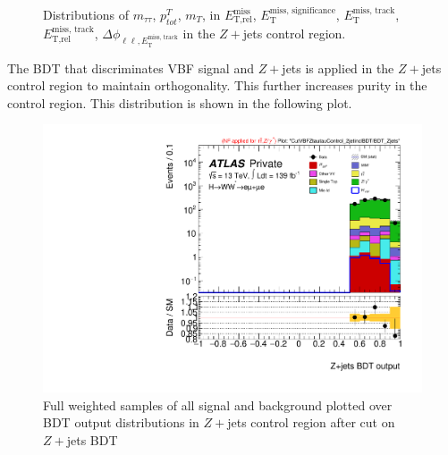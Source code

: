 \begin{figure}[!h]
{  }\hfill
  \hfill
  \hfill
{\caption{Distributions of $m_{\tau\tau}$, $p^T_{tot}$, $m_T$, in $\ensuremath{E_{\text{T,rel}}^{\text{miss}}}$, $\ensuremath{E_{\text{T}}^{\text{miss, significance}}}$, $\ensuremath{E_{\text{T}}^{\text{miss, track}}}$, $\ensuremath{E_{\text{T,rel}}^{\text{miss, track}}}$, $\ensuremath{\Delta\phi_{\ell\ell,E_{\text{T}}^{\text{miss, track}}}}$ in the $Z+$jets control region.
\label{fig:DYCR3}}}
\end{figure}
The BDT that discriminates VBF signal and $Z+$jets is applied in the $Z+$jets control region to maintain orthogonality. This further increases purity in the control region. This distribution is shown in the following plot. 
\begin{figure}[!htbp]
\centering
\includegraphics[width=.6\linewidth]{Pictures/run2-emme-CutVBFZtautauControl_2jetinclBDT-BDT_Zjets-log.pdf}
\caption{Full weighted samples of all signal and background plotted over BDT output distributions in $Z+$jets control region after cut on $Z+$jets BDT}
\label{fig:ZjetsBDTCR}
\end{figure}
